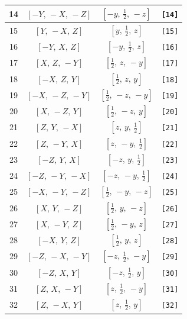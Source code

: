 \documentclass[fleqn,8pt]{jsarticle}
\begin{document}
\begin{longtable}{cccc}
14 & $\left[ - Y,\, - X,\, - Z \right]$ & $\left[ - y,\, \frac{1}{2},\, - z \right]$ & {\tt [14]} \\ \hline
15 & $\left[ Y,\, - X,\, Z \right]$ & $\left[ y,\, \frac{1}{2},\, z \right]$ & {\tt [15]} \\ \hline
16 & $\left[ - Y,\, X,\, Z \right]$ & $\left[ - y,\, \frac{1}{2},\, z \right]$ & {\tt [16]} \\ \hline
17 & $\left[ X,\, Z,\, - Y \right]$ & $\left[ \frac{1}{2},\, z,\, - y \right]$ & {\tt [17]} \\ \hline
18 & $\left[ - X,\, Z,\, Y \right]$ & $\left[ \frac{1}{2},\, z,\, y \right]$ & {\tt [18]} \\ \hline
19 & $\left[ - X,\, - Z,\, - Y \right]$ & $\left[ \frac{1}{2},\, - z,\, - y \right]$ & {\tt [19]} \\ \hline
20 & $\left[ X,\, - Z,\, Y \right]$ & $\left[ \frac{1}{2},\, - z,\, y \right]$ & {\tt [20]} \\ \hline
21 & $\left[ Z,\, Y,\, - X \right]$ & $\left[ z,\, y,\, \frac{1}{2} \right]$ & {\tt [21]} \\ \hline
22 & $\left[ Z,\, - Y,\, X \right]$ & $\left[ z,\, - y,\, \frac{1}{2} \right]$ & {\tt [22]} \\ \hline
23 & $\left[ - Z,\, Y,\, X \right]$ & $\left[ - z,\, y,\, \frac{1}{2} \right]$ & {\tt [23]} \\ \hline
24 & $\left[ - Z,\, - Y,\, - X \right]$ & $\left[ - z,\, - y,\, \frac{1}{2} \right]$ & {\tt [24]} \\ \hline
25 & $\left[ - X,\, - Y,\, - Z \right]$ & $\left[ \frac{1}{2},\, - y,\, - z \right]$ & {\tt [25]} \\ \hline
26 & $\left[ X,\, Y,\, - Z \right]$ & $\left[ \frac{1}{2},\, y,\, - z \right]$ & {\tt [26]} \\ \hline
27 & $\left[ X,\, - Y,\, Z \right]$ & $\left[ \frac{1}{2},\, - y,\, z \right]$ & {\tt [27]} \\ \hline
28 & $\left[ - X,\, Y,\, Z \right]$ & $\left[ \frac{1}{2},\, y,\, z \right]$ & {\tt [28]} \\ \hline
29 & $\left[ - Z,\, - X,\, - Y \right]$ & $\left[ - z,\, \frac{1}{2},\, - y \right]$ & {\tt [29]} \\ \hline
30 & $\left[ - Z,\, X,\, Y \right]$ & $\left[ - z,\, \frac{1}{2},\, y \right]$ & {\tt [30]} \\ \hline
31 & $\left[ Z,\, X,\, - Y \right]$ & $\left[ z,\, \frac{1}{2},\, - y \right]$ & {\tt [31]} \\ \hline
32 & $\left[ Z,\, - X,\, Y \right]$ & $\left[ z,\, \frac{1}{2},\, y \right]$ & {\tt [32]} \\ \hline

\end{longtable}
\end{document}
